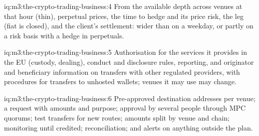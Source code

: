 \begin{solution}{iq:m3:the-crypto-trading-business:4}
From the available depth across venues at that hour (thin), perpetual prices, the time to hedge and its price risk, the  leg (fiat is closed), and
the client's settlement: wider than on a weekday, or partly on a risk basis with a hedge in perpetuals.
\end{solution}

\begin{solution}{iq:m3:the-crypto-trading-business:5}
Authorisation for the services it provides in the EU (custody, dealing), conduct and disclosure rules, reporting, and originator and beneficiary information on
transfers with other regulated providers, with procedures for transfers to unhosted wallets; venues it may use may change.
\end{solution}

\begin{solution}{iq:m3:the-crypto-trading-business:6}
Pre-approved destination addresses per venue; a request with amounts and purpose; approval by several people through MPC quorums; test transfers for new routes;
amounts split by venue and chain; monitoring until credited; reconciliation; and alerts on anything outside the plan.
\end{solution}
